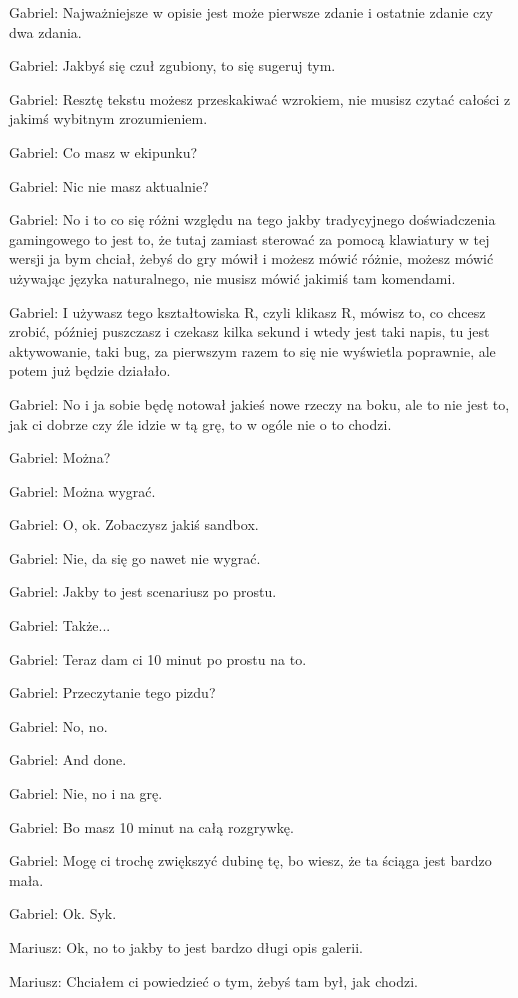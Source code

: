 Gabriel: Najważniejsze w opisie jest może pierwsze zdanie i ostatnie zdanie czy dwa zdania.

Gabriel: Jakbyś się czuł zgubiony, to się sugeruj tym.

Gabriel: Resztę tekstu możesz przeskakiwać wzrokiem, nie musisz czytać całości z jakimś wybitnym zrozumieniem.

Gabriel: Co masz w ekipunku?

Gabriel: Nic nie masz aktualnie?

Gabriel: No i to co się różni względu na tego jakby tradycyjnego doświadczenia gamingowego to jest to, że tutaj zamiast sterować za pomocą klawiatury w tej wersji ja bym chciał, żebyś do gry mówił i możesz mówić różnie, możesz mówić używając języka naturalnego, nie musisz mówić jakimiś tam komendami.

Gabriel: I używasz tego kształtowiska R, czyli klikasz R, mówisz to, co chcesz zrobić, później puszczasz i czekasz kilka sekund i wtedy jest taki napis, tu jest aktywowanie, taki bug, za pierwszym razem to się nie wyświetla poprawnie, ale potem już będzie działało.

Gabriel: No i ja sobie będę notował jakieś nowe rzeczy na boku, ale to nie jest to, jak ci dobrze czy źle idzie w tą grę, to w ogóle nie o to chodzi.

Gabriel: Można?

Gabriel: Można wygrać.

Gabriel: O, ok. Zobaczysz jakiś sandbox.

Gabriel: Nie, da się go nawet nie wygrać.

Gabriel: Jakby to jest scenariusz po prostu.

Gabriel: Także...

Gabriel: Teraz dam ci 10 minut po prostu na to.

Gabriel: Przeczytanie tego pizdu?

Gabriel: No, no.

Gabriel: And done.

Gabriel: Nie, no i na grę.

Gabriel: Bo masz 10 minut na całą rozgrywkę.

Gabriel: Mogę ci trochę zwiększyć dubinę tę, bo wiesz, że ta ściąga jest bardzo mała.

Gabriel: Ok. Syk.

Mariusz: Ok, no to jakby to jest bardzo długi opis galerii.

Mariusz: Chciałem ci powiedzieć o tym, żebyś tam był, jak chodzi.

